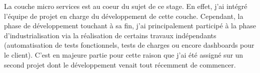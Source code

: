 La couche micro services est au coeur du sujet de ce stage. En effet, j'ai intégré l'équipe de projet en charge du développement de cette couche. Cependant, la phase de développement touchant à sa fin, j'ai principalement participé à la phase d'industrialisation via la réalisation de certains travaux indépendants (automatisation de tests fonctionnels, tests de charges ou encore dashboards pour le client). C'est en majeure partie pour cette raison que j'ai été assigné sur un second projet dont le développement venait tout récemment de commencer.

\newpage